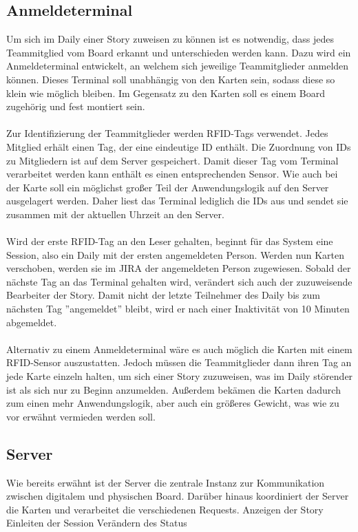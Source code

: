 \documentclass[12pt,titlepage]{scrartcl}
\begin{document}
		\subsection{Anmeldeterminal}
		Um sich im Daily einer Story zuweisen zu können ist es notwendig, dass jedes Teammitglied vom Board erkannt und unterschieden werden kann. Dazu wird ein Anmeldeterminal entwickelt, an welchem sich jeweilige Teammitglieder anmelden können. Dieses Terminal soll unabhängig von den Karten sein, sodass diese so klein wie möglich bleiben. Im Gegensatz zu den Karten soll es einem Board zugehörig und fest montiert sein. \\ \\
		Zur Identifizierung der Teammitglieder werden RFID-Tags verwendet. Jedes Mitglied erhält einen Tag, der eine eindeutige ID enthält. Die Zuordnung von IDs zu Mitgliedern ist auf dem Server gespeichert. Damit dieser Tag vom Terminal verarbeitet werden kann enthält es einen entsprechenden Sensor. Wie auch bei der Karte soll ein möglichst großer Teil der Anwendungslogik auf den Server ausgelagert werden. Daher liest das Terminal lediglich die IDs aus und sendet sie zusammen mit der aktuellen Uhrzeit an den Server. \\ \\
		Wird der erste RFID-Tag an den Leser gehalten, beginnt für das System eine Session, also ein Daily mit der ersten angemeldeten Person. Werden nun Karten verschoben, werden sie im JIRA der angemeldeten Person zugewiesen. Sobald der nächste Tag an das Terminal gehalten wird, verändert sich auch der zuzuweisende Bearbeiter der Story. Damit nicht der letzte Teilnehmer des Daily bis zum nächsten Tag ''angemeldet'' bleibt, wird er nach einer Inaktivität von 10 Minuten abgemeldet. \\ \\
		Alternativ zu einem Anmeldeterminal wäre es auch möglich die Karten mit einem RFID-Sensor auszustatten. Jedoch müssen die Teammitglieder dann ihren Tag an jede Karte einzeln halten, um sich einer Story zuzuweisen, was im Daily störender ist als sich nur zu Beginn anzumelden. Außerdem bekämen die Karten dadurch zum einen mehr Anwendungslogik, aber auch ein größeres Gewicht, was wie zu vor erwähnt vermieden werden soll.
 		\subsection{Server} \label{archserver}
 		Wie bereits erwähnt ist der Server die zentrale Instanz zur Kommunikation zwischen digitalem und physischen Board. Darüber hinaus koordiniert der Server die Karten und verarbeitet die verschiedenen Requests.
 		Anzeigen der Story
 		Einleiten der Session
 		Verändern des Status
\end{document}
